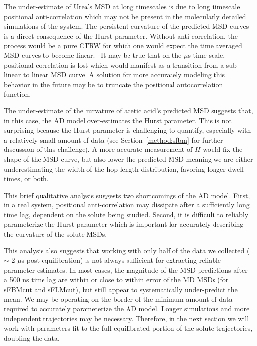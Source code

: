 \documentclass{article}
\begin{document}
  The under-estimate of Urea's MSD at long timescales is due to long timescale
  positional anti-correlation which may not be present in the molecularly 
  detailed simulations of the system. The 
  persistent curvature of the predicted MSD curves is a direct consequence of 
  the Hurst parameter. Without anti-correlation, the process would be 
  a pure CTRW for which one would expect the time averaged MSD curves to become 
  linear.~\cite{meroz_toolbox_2015} It may be true that on the $\mu$s time scale, 
  positional correlation is lost which would manifest as a transition from a sub-linear
  to linear MSD curve. A solution for more accurately modeling this behavior in  
  the future may be to truncate the positional autocorrelation function.~\cite{molina-garcia_crossover_2018}
  
  The under-estimate of the curvature of acetic acid's predicted MSD suggests that,
  in this case, the AD model over-estimates the Hurst parameter. This is not surprising
  because the Hurst parameter is challenging to quantify, especially with a relatively 
  small amount of data (see Section~\ref{method:sfbm} for further discussion of this 
  challenge). A more accurate measurement of $H$ would fix the shape of the MSD curve,
  but also lower the predicted MSD meaning we are either underestimating the width of
  the hop length distribution, favoring longer dwell times, or both.
  
  This brief qualitative analysis suggests two shortcomings of the AD model. First, in
  a real system, positional anti-correlation may dissipate after a sufficiently long 
  time lag, dependent on the solute being studied. Second, it is difficult to reliably
  parameterize the Hurst parameter which is important for accurately describing the 
  curvature of the solute MSDs.
  
  This analysis also suggests that working with only half of the data we collected
  ($\sim$ 2 $\mu$s post-equilibration) is not always sufficient for extracting reliable
  parameter estimates. In most cases, the magnitude of the MSD predictions after a 
  500 ns time lag are within or close to within error of the MD MSDs (for sFBMcut and
  sFLMcut), but still appear to systematically under-predict the mean. We may be
  operating on the border of the minimum amount of data required to accurately 
  parameterize the AD model. Longer simulations and more independent trajectories may
  be necessary. Therefore, in the next section we will work with parameters fit to the
  full equilibrated portion of the solute trajectories, doubling the data.
  
\end{document}
